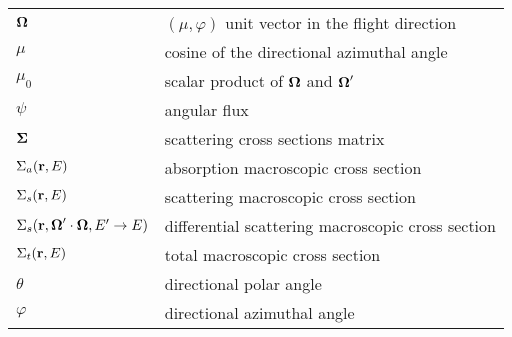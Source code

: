 \begin{xtabular}{ll}
     $\boldsymbol{\Omega}$ & $(\mu,\varphi)$ unit vector in the flight direction \tabularnewline
     $\mu$ & cosine of the directional azimuthal angle \tabularnewline
   $\mu_0$ & scalar product of $\boldsymbol{\Omega}$ and $\boldsymbol{\Omega}'$ \tabularnewline
    $\psi$ & angular flux \tabularnewline
$\boldsymbol{\Sigma}$ & scattering cross sections matrix \tabularnewline
$\Sigma_a(\mathbf{r},E)$ & absorption macroscopic cross section \tabularnewline
$\Sigma_s(\mathbf{r},E)$ & scattering macroscopic cross section \tabularnewline
$\Sigma_s(\mathbf{r},\boldsymbol{\Omega}'\cdot\boldsymbol{\Omega},E'\rightarrow E)$ & differential scattering macroscopic 
  cross section \tabularnewline
$\Sigma_t(\mathbf{r},E)$ & total macroscopic cross section \tabularnewline
  $\theta$ & directional polar angle \tabularnewline
 $\varphi$ & directional azimuthal angle \tabularnewline
\end{xtabular}

\pagebreak{}
